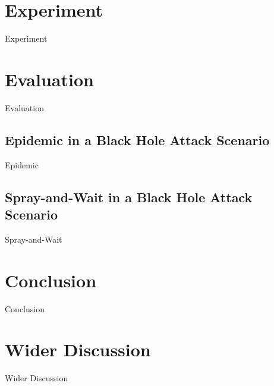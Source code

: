 \documentclass{article}
\begin{document}
\section{Experiment}
Experiment

\section{Evaluation}
Evaluation

\subsection{Epidemic in a Black Hole Attack Scenario}
Epidemic

\subsection{Spray-and-Wait in a Black Hole Attack Scenario}
Spray-and-Wait

\section{Conclusion}
Conclusion

\section{Wider Discussion}
Wider Discussion
\end{document}
